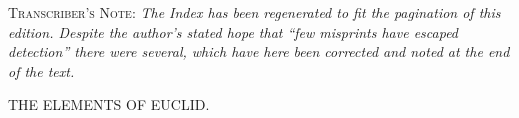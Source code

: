 \documentclass[oneside]{book}
\begin{document}
\bigskip\bigskip
\scriptsize \noindent \textsc{Transcriber's Note:} \emph{The Index has been regenerated
to fit the pagination of this edition. Despite the author's stated hope that ``few misprints
have escaped detection'' there were several, which have here been corrected and
noted at the end of the text.} \normalsize





\vfill
\begin{center}
\end{center}
\vfill
\newpage






\vfill
\begin{center}
{\Large THE ELEMENTS OF EUCLID.}
\end{center}
\vfill
\newpage



\vfill
\end{document}
